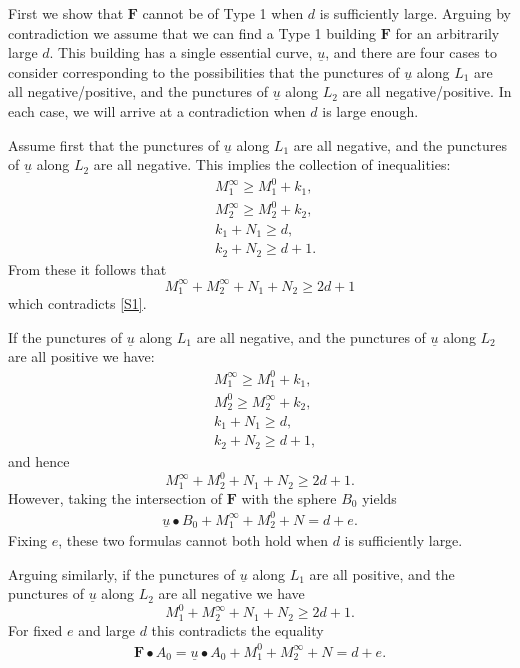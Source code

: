 \documentclass[12pt]{amsart}
\theoremstyle{definition}
\begin{document}
\bigskip


 First we show that $\mathbf{F}$ cannot be of Type 1 when $d$ is sufficiently large. Arguing by contradiction we assume that we can find a Type 1 building $\mathbf{F}$ for an arbitrarily large $d$. This building  has a single essential curve, $\underline{u}$,  and there are four cases to consider corresponding to the possibilities that the punctures of $\underline{u}$ along $L_1$ are all negative/positive, and the punctures of $\underline{u}$ along $L_2$ are all negative/positive. In each case, we will arrive at a contradiction when $d$ is large enough.

\bigskip

 Assume first that the punctures of $\underline{u}$ along $L_1$ are all negative, and the punctures of $\underline{u}$ along $L_2$ are all negative. This implies the collection of inequalities:
\begin{align*}
    &M_1^\infty \geq M_1^0 + k_1,\\
    &M_2^\infty \geq M_2^0 + k_2,\\
    &k_1 +N_1 \geq d,\\
    &k_2 +N_2 \geq d+1.
\end{align*}
From these it follows that 
$$M_1^\infty + M_2^\infty + N_1 + N_2 \ge 2d+1$$
which contradicts \eqref{S1}.


\bigskip

 If the punctures of $\underline{u}$ along $L_1$ are all negative, and the punctures of $\underline{u}$ along $L_2$ are all positive we have:
\begin{align*}
    &M_1^\infty \geq M_1^0 + k_1,\\
    &M_2^0 \geq M_2^\infty + k_2,\\
    &k_1 +N_1 \geq d,\\
    &k_2 +N_2 \geq d+1,
\end{align*}
and hence
$$M_1^\infty + M_2^0 + N_1 + N_2 \ge 2d+1.$$
However, taking the intersection of $\mathbf{F}$ with the sphere $B_0$ yields 
\begin{align*}
    \underline{u} \bullet B_0 + M_1^\infty+M_2^0 +N =d+e.
\end{align*}
Fixing $e$, these two formulas cannot both hold when $d$ is  sufficiently large. 



\bigskip

 Arguing similarly, if the punctures of $\underline{u}$ along $L_1$ are all positive, and the punctures of $\underline{u}$ along $L_2$ are all negative we have
$$M_1^0 + M_2^\infty + N_1 + N_2 \ge 2d+1.$$ For fixed $e$ and large $d$ this contradicts the equality
\begin{align*}
  \mathbf{F} \bullet A_0 = \underline{u} \bullet A_0 + M_1^0 +M_2^\infty +N =d+e.
\end{align*}
\end{document}
